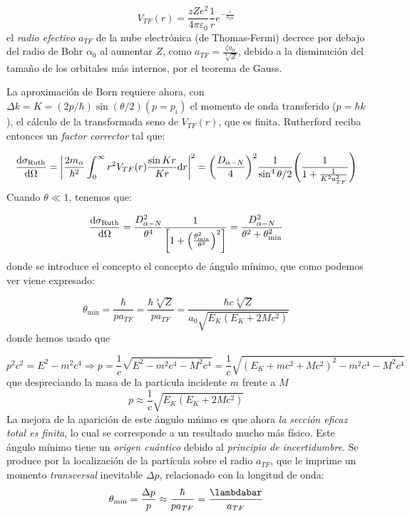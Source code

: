 \begin{equation}
    V_{TF} (r) = \frac{zZe^2}{4\pi\varepsilon_0} \frac{1}{r} e^{-\frac{r}{a_{TF}}}
\end{equation}
el \textit{radio efectivo} $a_{TF}$ de la nube electrónica (de Thomas-Fermi) decrece por debajo del radio de Bohr $\alpha_0$ al aumentar $Z$, como $a_{TF}=\frac{\zeta a_0}{\sqrt[3]{Z}}$, debido a la disminución del tamaño de los orbitales más internos, por el teorema de Gauss. 

La aproximación de Born requiere ahora, con $\Delta k = K=(2p/\hbar) \sin(\theta/2) (p=p_i)$ el momento de onda transferido ($p = \hbar k$), el cálculo de la transformada seno de $V_{TF}(r)$, que es finita. Rutherford reciba entonces un \textit{factor corrector} tal que:

\begin{equation}
    \dv{\sigma_{\Ruth}}{\Omega} = \vqty{\frac{2m_\alpha}{\hbar^2}\int_{0}^{\infty} r^2 V_{TF}(r) \frac{\sin Kr}{Kr} \D r }^2 = \pqty{\frac{D_{\alpha-N}}{4}}^2 \frac{1}{\sin^4 \theta/2} \pqty{\frac{1}{1+\frac{1}{K^2 a_{TF}^2}}}
\end{equation}
Cuando $\theta\ll 1$, tenemos que: 

\begin{equation}
    \dv{\sigma_{\Ruth}}{\Omega} = \frac{D_{\alpha-N}^2}{\theta^4} \frac{1}{\bqty{1+\pqty{\frac{\theta_{\min}^2}{\theta^2}}^2}} = \frac{D_{\alpha-N}^2}{\theta^2+\theta_{\min}^2} 
\end{equation}
donde se introduce el concepto el concepto de ángulo mínimo, que como podemos ver viene expresado: 

\begin{equation}
    \theta_{\min} = \frac{\hbar}{p a_{TF}} = \frac{\hbar \sqrt[3]{Z}}{pa_{TF}} = \frac{\hbar c \sqrt[3]{Z}}{a_0 \sqrt{E_K(E_K+2Mc^2)}}  \label{Ec:02-thetamin}
\end{equation}
donde hemos usado que 

\begin{equation*}
    p^2 c^2 = E^2 - m^2 c^4 \Rightarrow p  = \frac{1}{c} \sqrt{E^2 - m^2 c^4 - M^2 c^4} = \frac{1}{c} \sqrt{(E_K + m c^2 + M c^2)^2 - m^2 c^4  - M^2 c^4} 
\end{equation*}
que despreciando la masa de la partícula incidente $m$ frente a $M$
\begin{equation}
    p  \approx \frac{1}{c} \sqrt{E_K (E_K + 2 Mc^2) } 
\end{equation}
La mejora de la aparición de este ángulo mńimo es que ahora \textit{la sección eficaz total es finita}, lo cual se corresponde a un resultado mucho más físico. Este ángulo mínimo tiene un \textit{origen cuántico} debido al \textit{principio de incertidumbre}. Se produce por la localización de la partícula sobre el radio $a_{TF}$, que le imprime un momento \textit{transversal} inevitable $\Delta p$, relacionado con la longitud de onda: 
\begin{equation}
    \theta_{\min} = \frac{\Delta p}{p} \approx \frac{\hbar}{pa_{TF}} = \frac{\lambdabar}{a_{TF}}
\end{equation}
